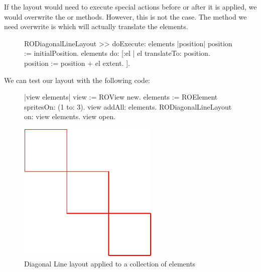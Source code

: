 \documentclass[a4paper,10pt,twoside]{book}
\begin{document}
If the layout would need to execute special actions before or after it is applied, we would overwrite the  or  methods. However, this is not the case. 
The method we need overwrite is  which will actually translate the elements.

\begin{figure}[H]
\begin{code}{}
RODiagonalLineLayout >> doExecute: elements
	|position|	
	position := initialPosition.
	elements do: [:el | 
		el translateTo: position.
		position := position + el extent.
	].	
\end{code}
\end{figure}

We can test our layout with the following code:

\begin{figure}[H]
      \begin{minipage}[t]{0.61\textwidth}
      \vspace{0pt}
\begin{code}{}
|view elements|
view := ROView new.
elements := ROElement spritesOn: (1 to: 3).
view addAll: elements.
RODiagonalLineLayout on: view elements.
view open.
\end{code}
   \end{minipage}
   \hfill
   \begin{minipage}[t]{0.5\textwidth}
      \vspace{0pt}\raggedright
       \centering
		\includegraphics[width=0.6\textwidth]{diagonalLineLayout}
   \end{minipage}
\label{fig:diagonalLineLayout}
\caption{Diagonal Line layout applied to a collection of elements}
\end{figure} 
\end{document}
